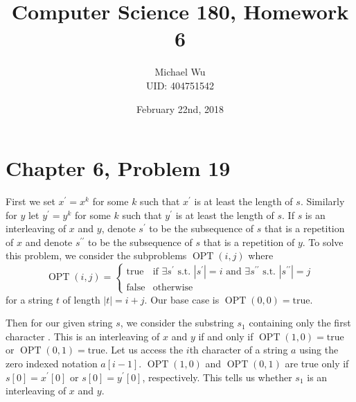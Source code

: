 \documentclass[12pt]{article}
\begin{document}
\title{Computer Science 180, Homework 6}
\date{February 22nd, 2018}
\author{Michael Wu\\UID: 404751542}
\maketitle

\section*{Chapter 6, Problem 19}

First we set \(x^\prime=x^k\) for some \(k\) such that \(x^\prime\) is at least the length of \(s\). Similarly for \(y\)
let \(y^\prime=y^k\) for some \(k\) such that \(y^\prime\) is at least the length of \(s\). If \(s\) is an interleaving of
\(x\) and \(y\), denote \(s^\prime\) to be the subsequence of \(s\) that is a repetition of \(x\) and denote \(s^{\prime\prime}\)
to be the subsequence of \(s\) that is a repetition of \(y\). To solve this problem, we consider the subproblems \(\operatorname{OPT}(i,j)\) where
\[
        \operatorname{OPT}(i,j)=\begin{cases}
                \text{true} & \text{if }\exists s^\prime\text{ s.t. } |s^\prime|=i\text{ and }\exists s^{\prime\prime}\text{ s.t. }|s^{\prime\prime}|=j\\
                \text{false} & \text{otherwise}
        \end{cases}
\]
for a string \(t\) of length \(|t|=i+j\). Our base case is \(\operatorname{OPT}(0,0)=\text{true}\).

Then for our given string \(s\), we consider the substring \(s_1\) containing only the first character . This is an interleaving of
\(x\) and \(y\) if and only if \(\operatorname{OPT}(1,0)=\text{true}\) or \(\operatorname{OPT}(0,1)=\text{true}\). Let us access the
\(i\)th character of a string \(a\) using the zero indexed notation \(a[i-1]\). \(\operatorname{OPT}(1,0)\) and \(\operatorname{OPT}(0,1)\)
are true only if \(s[0]=x^\prime[0]\) or \(s[0]=y^\prime[0]\), respectively. This tells us whether \(s_1\) is an interleaving of \(x\) and \(y\).
\end{document}
